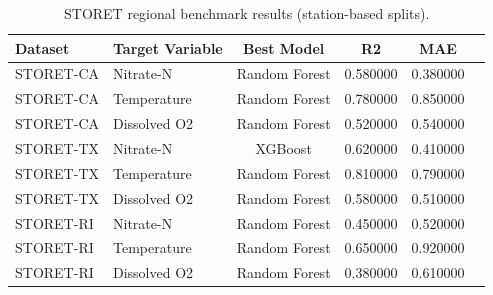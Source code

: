 \begin{table}
\caption{STORET regional benchmark results (station-based splits).}
\label{tab:storet}
\begin{tabular}{llcccc}
\toprule
Dataset & Target Variable & Best Model & R2 & MAE \\
\midrule
STORET-CA & Nitrate-N & Random Forest & 0.580000 & 0.380000 \\
STORET-CA & Temperature & Random Forest & 0.780000 & 0.850000 \\
STORET-CA & Dissolved O2 & Random Forest & 0.520000 & 0.540000 \\
STORET-TX & Nitrate-N & XGBoost & 0.620000 & 0.410000 \\
STORET-TX & Temperature & Random Forest & 0.810000 & 0.790000 \\
STORET-TX & Dissolved O2 & Random Forest & 0.580000 & 0.510000 \\
STORET-RI & Nitrate-N & Random Forest & 0.450000 & 0.520000 \\
STORET-RI & Temperature & Random Forest & 0.650000 & 0.920000 \\
STORET-RI & Dissolved O2 & Random Forest & 0.380000 & 0.610000 \\
\bottomrule
\end{tabular}
\end{table}
